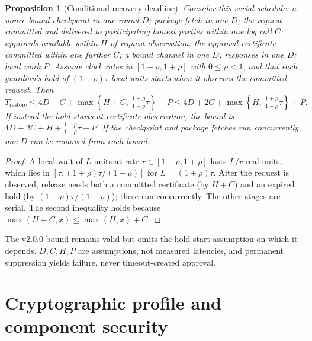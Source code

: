 \documentclass[pdflatex,sn-mathphys-num]{sn-jnl}
\theoremstyle{plain}
\newtheorem{proposition}[theorem]{Proposition}
\theoremstyle{definition}
\begin{document}
\begin{proposition}[Conditional recovery deadline]\label{prop:deadline}
Consider this serial schedule: a nonce-bound checkpoint in one round $D$; package fetch in one $D$; the request committed and delivered to participating honest parties within one log call $C$; approvals available within $H$ of request observation; the approval certificate committed within one further $C$; a bound channel in one $D$; responses in one $D$; local work $P$. Assume clock rates in $[1-\rho,1+\rho]$ with $0\le\rho<1$, and that each guardian's hold of $(1+\rho)\tau$ local units starts when it observes the committed request. Then
\begin{equation}\label{eq:deadline}
 T_{\mathrm{restore}}\le4D+C+\max\!\left\{H+C,\ \tfrac{1+\rho}{1-\rho}\tau\right\}+P
 \le4D+2C+\max\!\left\{H,\ \tfrac{1+\rho}{1-\rho}\tau\right\}+P.
\end{equation}
If instead the hold starts at certificate observation, the bound is $4D+2C+H+\frac{1+\rho}{1-\rho}\tau+P$. If the checkpoint and package fetches run concurrently, one $D$ can be removed from each bound.
\end{proposition}
\begin{proof}
A local wait of $L$ units at rate $r\in[1-\rho,1+\rho]$ lasts $L/r$ real units, which lies in $[\tau,(1+\rho)\tau/(1-\rho)]$ for $L=(1+\rho)\tau$. After the request is observed, release needs both a committed certificate (by $H+C$) and an expired hold (by $(1+\rho)\tau/(1-\rho)$); these run concurrently. The other stages are serial. The second inequality holds because $\max(H+C,x)\le\max(H,x)+C$.
\end{proof}

The v2.0.0 bound remains valid but omits the hold-start assumption on which it depends. $D,C,H,P$ are assumptions, not measured latencies, and permanent suppression yields failure, never timeout-created approval.


\section{Cryptographic profile and component security}\label{sec:crypto}
\end{document}
